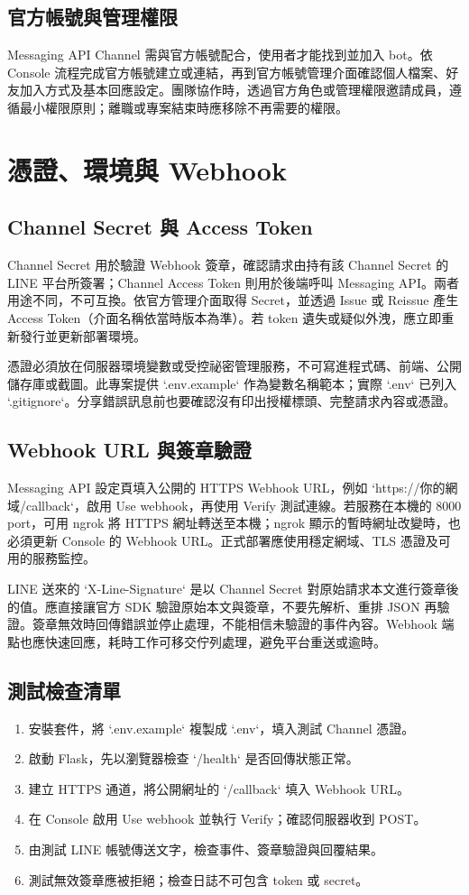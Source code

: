 \documentclass[12pt,a4paper,openany]{book}
\begin{document}
\section{官方帳號與管理權限}
Messaging API Channel 需與官方帳號配合，使用者才能找到並加入 bot。依 Console 流程完成官方帳號建立或連結，再到官方帳號管理介面確認個人檔案、好友加入方式及基本回應設定。團隊協作時，透過官方角色或管理權限邀請成員，遵循最小權限原則；離職或專案結束時應移除不再需要的權限。

\chapter{憑證、環境與 Webhook}
\section{Channel Secret 與 Access Token}
Channel Secret 用於驗證 Webhook 簽章，確認請求由持有該 Channel Secret 的 LINE 平台所簽署；Channel Access Token 則用於後端呼叫 Messaging API。兩者用途不同，不可互換。依官方管理介面取得 Secret，並透過 Issue 或 Reissue 產生 Access Token（介面名稱依當時版本為準）。若 token 遺失或疑似外洩，應立即重新發行並更新部署環境。

憑證必須放在伺服器環境變數或受控祕密管理服務，不可寫進程式碼、前端、公開儲存庫或截圖。此專案提供 `.env.example` 作為變數名稱範本；實際 `.env` 已列入 `.gitignore`。分享錯誤訊息前也要確認沒有印出授權標頭、完整請求內容或憑證。

\section{Webhook URL 與簽章驗證}
Messaging API 設定頁填入公開的 HTTPS Webhook URL，例如 `https://你的網域/callback`，啟用 Use webhook，再使用 Verify 測試連線。若服務在本機的 8000 port，可用 ngrok 將 HTTPS 網址轉送至本機；ngrok 顯示的暫時網址改變時，也必須更新 Console 的 Webhook URL。正式部署應使用穩定網域、TLS 憑證及可用的服務監控。

LINE 送來的 `X-Line-Signature` 是以 Channel Secret 對原始請求本文進行簽章後的值。應直接讓官方 SDK 驗證原始本文與簽章，不要先解析、重排 JSON 再驗證。簽章無效時回傳錯誤並停止處理，不能相信未驗證的事件內容。Webhook 端點也應快速回應，耗時工作可移交佇列處理，避免平台重送或逾時。

\section{測試檢查清單}
\begin{enumerate}
  \item 安裝套件，將 `.env.example` 複製成 `.env`，填入測試 Channel 憑證。
  \item 啟動 Flask，先以瀏覽器檢查 `/health` 是否回傳狀態正常。
  \item 建立 HTTPS 通道，將公開網址的 `/callback` 填入 Webhook URL。
  \item 在 Console 啟用 Use webhook 並執行 Verify；確認伺服器收到 POST。
  \item 由測試 LINE 帳號傳送文字，檢查事件、簽章驗證與回覆結果。
  \item 測試無效簽章應被拒絕；檢查日誌不可包含 token 或 secret。
\end{enumerate}
\end{document}
